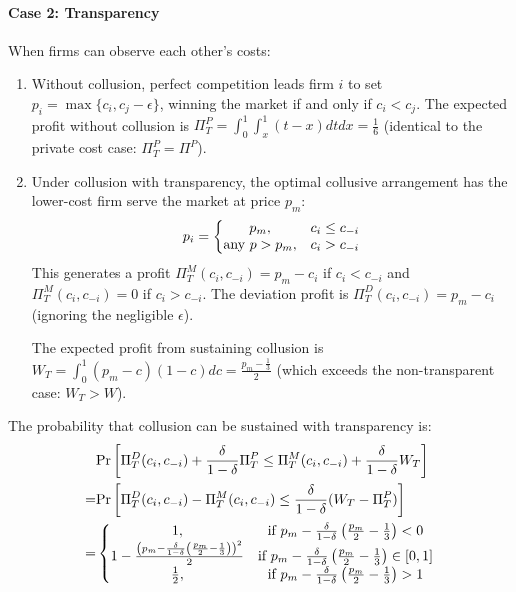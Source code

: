 \documentclass[12pt]{article}
\begin{document}
\paragraph{Case 2: Transparency} When firms can observe each other's costs:
\begin{enumerate}
    \item Without collusion, perfect competition leads firm $i$ to set $p_i=\max\{c_i,c_j-\epsilon\}$, winning the market if and only if $c_i< c_j$. The expected profit without collusion is $\Pi^P_T=\int_0^1 \int_x^1 (t-x) dt dx=\frac{1}{6}$ (identical to the private cost case: $\Pi^P_T=\Pi^P$).
    \item Under collusion with transparency, the optimal collusive arrangement has the lower-cost firm serve the market at price $p_m$:
    $$p_i = \left\{\begin{matrix}
        p_m,&c_i\leq c_{-i}\\
        \textnormal{any }p>p_m,&c_i>c_{-i}
    \end{matrix}\right.$$
    This generates a profit $\Pi^M_T(c_i,c_{-i})=p_m-c_i$ if $c_i< c_{-i}$ and $\Pi^M_T(c_i,c_{-i})=0$ if $c_i>c_{-i}$. The deviation profit is $\Pi^D_T(c_i,c_{-i})=p_m-c_i$ (ignoring the negligible $\epsilon$).
    
    The expected profit from sustaining collusion is $W_T=\int_0^1 (p_m-c)(1-c)dc=\frac{p_m-\frac{1}{3}}{2}$ (which exceeds the non-transparent case: $W_T>W$).
\end{enumerate}

The probability that collusion can be sustained with transparency is:
\begin{equation}
    \begin{aligned}
        &\textnormal{Pr}\left[\Pi^D_T(c_i,c_{-i})+\frac{\delta}{1-\delta}\Pi^P_T\leq \Pi^M_T(c_i,c_{-i})+\frac{\delta}{1-\delta}W_T\right]\\
        =&\textnormal{Pr}\left[\Pi^D_T(c_i,c_{-i})-\Pi^M_T(c_i,c_{-i})\leq \frac{\delta}{1-\delta}(W_T-\Pi^P_T)\right]\\
        =&\left\{\begin{matrix}
            1,&\text{if }p_m-\frac{\delta}{1-\delta}\left(\frac{p_m}{2}-\frac{1}{3}\right)<0\\
            1-\frac{\left(p_m-\frac{\delta}{1-\delta}\left(\frac{p_m}{2}-\frac{1}{3}\right)\right)^2}{2}&\text{if }p_m-\frac{\delta}{1-\delta}\left(\frac{p_m}{2}-\frac{1}{3}\right)\in[0,1]\\
            \frac{1}{2},&\text{if }p_m-\frac{\delta}{1-\delta}\left(\frac{p_m}{2}-\frac{1}{3}\right)>1
        \end{matrix}\right.
    \end{aligned}
    \label{eq_t}
\end{equation}
\end{document}
